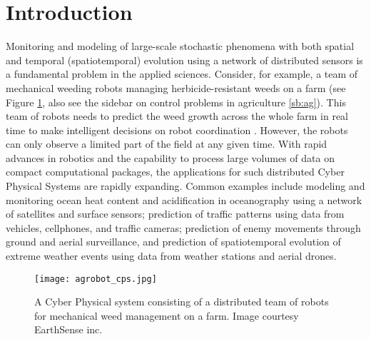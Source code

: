 \section{Introduction} \label{sec:intro}
Monitoring and modeling of large-scale stochastic phenomena with both spatial and temporal (spatiotemporal) evolution using a network of distributed sensors is a fundamental problem in the applied sciences. Consider, for example, a team of mechanical weeding robots managing herbicide-resistant weeds on a farm (see Figure \ref{fig:cps}, also see the sidebar on control problems in agriculture \ref{sb:ag}). This team of robots needs to predict the weed growth across the whole farm in real time to make intelligent decisions on robot coordination \cite{McAllistar18IROS}. However, the robots can only observe a limited part of the field at any given time. With rapid advances in robotics and the capability to process large volumes of data on compact computational packages, the applications for such distributed Cyber Physical Systems are rapidly expanding. Common examples include modeling and monitoring ocean heat content and acidification in oceanography using a network of satellites and surface sensors; prediction of traffic patterns using data from vehicles, cellphones, and traffic cameras; prediction of enemy movements through ground and aerial surveillance, and prediction of spatiotemporal evolution of extreme weather events using data from weather stations and aerial drones. %
 
\begin{figure}[h] %
	\centering
	\texttt{[image: agrobot\_cps.jpg]}
		\caption{A Cyber Physical system consisting of a distributed team of robots for mechanical weed management on a farm. Image courtesy EarthSense inc.}
	\label{fig:cps}
\end{figure}



